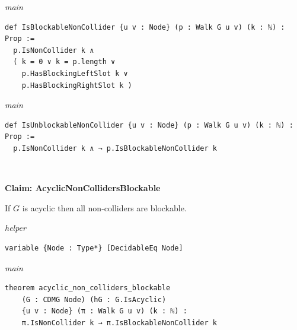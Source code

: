 {\small\textit{main}}
\begin{verbatim}
def IsBlockableNonCollider {u v : Node} (p : Walk G u v) (k : ℕ) : Prop :=
  p.IsNonCollider k ∧
  ( k = 0 ∨ k = p.length ∨
    p.HasBlockingLeftSlot k ∨
    p.HasBlockingRightSlot k )
\end{verbatim}
{\small\textit{main}}
\begin{verbatim}
def IsUnblockableNonCollider {u v : Node} (p : Walk G u v) (k : ℕ) : Prop :=
  p.IsNonCollider k ∧ ¬ p.IsBlockableNonCollider k
\end{verbatim}
~%

\vspace{\appendixNotesGap}

\noindent\textbf{Claim: AcyclicNonCollidersBlockable}\par\smallskip
{\appendixTexSize
If $G$ is acyclic then all non-colliders are blockable.
\par}
\smallskip
{\small\textit{helper}}
\begin{verbatim}
variable {Node : Type*} [DecidableEq Node]
\end{verbatim}
{\small\textit{main}}
\begin{verbatim}
theorem acyclic_non_colliders_blockable
    (G : CDMG Node) (hG : G.IsAcyclic)
    {u v : Node} (π : Walk G u v) (k : ℕ) :
    π.IsNonCollider k → π.IsBlockableNonCollider k
\end{verbatim}
~%

\vspace{\appendixNotesGap}

